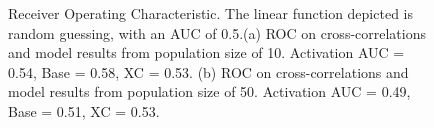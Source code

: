 \documentclass[11pt,titlepage]{article}
\begin{document}
\begin{figure}[H]
\begin{minipage}{0.49\linewidth}
\captionsetup{position=top}
\end{minipage}
\begin{minipage}{0.50\linewidth}
\captionsetup{position=top}
\end{minipage}
\caption[Receiver Operating Characteristic]{Receiver Operating Characteristic. The linear function depicted is random guessing, with an AUC of 0.5.(a) ROC on cross-correlations and model results from population size of 10. Activation AUC = 0.54, Base = 0.58, XC = 0.53. (b) ROC on cross-correlations and model results from population size of 50. Activation AUC = 0.49, Base = 0.51, XC = 0.53.}
\label{fig:roc}
\end{figure}
\end{document}
